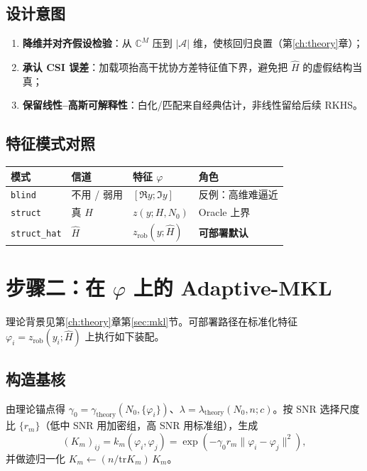 \subsection{设计意图}
\begin{enumerate}[leftmargin=2em]
  \item \textbf{降维并对齐假设检验}：从 $\mathbb{C}^{M}$ 压到 $|\mathcal{A}|$ 维，使核回归良置（第\ref{ch:theory}章）；
  \item \textbf{承认 CSI 误差}：加载项抬高干扰协方差特征值下界，避免把 $\hat H$ 的虚假结构当真；
  \item \textbf{保留线性--高斯可解释性}：白化/匹配来自经典估计，非线性留给后续 RKHS。
\end{enumerate}

\subsection{特征模式对照}
\begin{center}
\begin{tabular}{llll}
\toprule
模式 & 信道 & 特征 $\varphi$ & 角色 \\
\midrule
\texttt{blind} & 不用 / 弱用 & $[\Re y;\Im y]$ & 反例：高维难逼近 \\
\texttt{struct} & 真 $H$ & $z(y;H,N_0)$ & Oracle 上界 \\
\texttt{struct\_hat} & $\hat H$ & $z_{\mathrm{rob}}(y;\hat H)$ & \textbf{可部署默认} \\
\bottomrule
\end{tabular}
\end{center}

\section{步骤二：在 $\varphi$ 上的 Adaptive-MKL}
\label{sec:method-mkl}

理论背景见第\ref{ch:theory}章第\ref{sec:mkl}节。可部署路径在标准化特征 $\varphi_i=z_{\mathrm{rob}}(y_i;\hat H)$ 上执行如下装配。

\subsection{构造基核}
由理论锚点得 $\gamma_0=\gamma_{\mathrm{theory}}(N_0,\{\varphi_i\})$、$\lambda=\lambda_{\mathrm{theory}}(N_0,n;c)$。按 SNR 选择尺度比 $\{r_m\}$（低中 SNR 用加密组，高 SNR 用标准组），生成
\begin{equation}
(K_m)_{ij}=k_m(\varphi_i,\varphi_j)=\exp(-\gamma_0 r_m\|\varphi_i-\varphi_j\|^2),
\end{equation}
并做迹归一化 $K_m\leftarrow (n/\mathrm{tr}K_m)\,K_m$。

